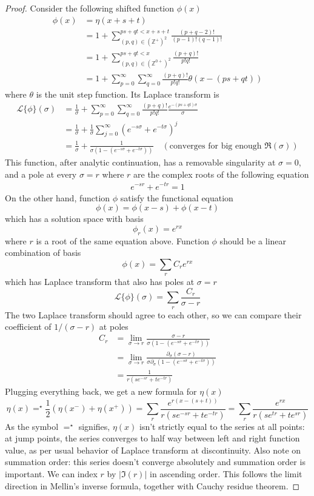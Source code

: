 \documentclass[]{article}
\begin{document}
\begin{proof}

Consider the following shifted function $\phi(x)$
\begin{align*}
	\phi(x) &= \eta(x + s +t) \\
	&= 1 + \sum_{(p,q)\in(\mathbb{Z}^+)^2}^{ps+qt < x+s+t} \frac{(p+q-2)!}{(p-1)!(q-1)!}\\
	&= 1 + \sum_{(p,q)\in(\mathbb{Z}^{0+})^2}^{ps+qt < x} \frac{(p+q)!}{p!q!}\\
	&= 1 + \sum_{p=0}^{\infty}\sum_{q=0}^{\infty} \frac{(p+q)!}{p!q!} \theta(x - (ps + qt))
\end{align*}
where $\theta$ is the unit step function. Its Laplace transform is
\begin{align*}
\mathcal{L}\{\phi\}(\sigma) &= \frac{1}{\sigma} + \sum_{p=0}^{\infty}\sum_{q=0}^{\infty} \frac{(p+q)!}{p!q!} \frac{e^{-(ps+qt)\sigma}}{\sigma} \\
&= \frac{1}{\sigma} + \frac{1}{\sigma} \sum_{j=0}^{\infty} (e^{-s\sigma} + e^{-t\sigma})^j\\
&= \frac{1}{\sigma} + \frac{1}{\sigma(1- (e^{-s\sigma} + e^{-t\sigma}))} \quad(\text{converges for big enough }\mathfrak{R}(\sigma))
\end{align*}
This function, after analytic continuation, has a removable singularity at $\sigma = 0$, and a pole at every $\sigma = r$ where $r$ are the complex roots of the following equation
\begin{align*}
e^{-sr} + e^{-tr} = 1
\end{align*}
On the other hand, function $\phi$ satisfy the functional equation
\[
\phi(x) = \phi(x - s) + \phi(x - t)
\]
which has a solution space with basis
\[
\phi_r(x) = e^{r x}
\]
where $r$ is a root of the same equation above. Function $\phi$ should be a linear combination of basis
\[
\phi(x) = \sum_{r} C_r e^{r x}
\]
which has Laplace transform that also has poles at $\sigma = r$
\[
\mathcal{L}\{\phi\}(\sigma) = \sum_{r} \frac{C_r}{\sigma - r}
\]
The two Laplace transform should agree to each other, so we can compare their coefficient of $1/(\sigma - r)$ at poles
\begin{align*}
C_r &= \lim_{\sigma\to r} \frac{\sigma - r}{\sigma(1- (e^{-s\sigma} + e^{-t\sigma}))} \\
&= \lim_{\sigma\to r} \frac{\partial_\sigma(\sigma - r)}{\sigma\partial_\sigma(1- (e^{-s\sigma} + e^{-t\sigma}))} \\
    &= \frac{1}{r(s e^{-sr} + t e^{-tr})}
\end{align*}
Plugging everything back, we get a new formula for $\eta(x)$
\[
\eta(x) =^{\star} \frac{1}{2}(\eta(x^-) + \eta(x^+)) = \sum_r \frac{e^{r(x - (s +t))}}{r(s e^{-sr} + t e^{-tr})}  = \sum_r \frac{e^{rx}}{r(s e^{tr} + t e^{sr})}
\]
As the symbol $=^{\star}$ signifies, $\eta(x)$ isn't strictly equal to the series at all points: at jump points, the series converges to half way between left and right function value, as per usual behavior of Laplace transform at discontinuity. Also note on summation order: this series doesn't converge absolutely and summation order is important. We can index $r$ by $|\mathfrak{I}(r)|$ in ascending order. This follows the limit direction in Mellin's inverse formula, together with Cauchy residue theorem.


\end{proof}
\end{document}
